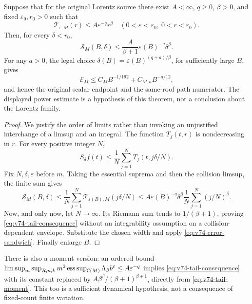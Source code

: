 \begin{theorem}
\label{thm:v74-tail-criterion}
Suppose that for the original Lorentz source there exist
$A<\infty$, $q\ge0$, $\beta>0$, and fixed $\varepsilon_0,r_0>0$
such that
\begin{equation}\label{eq:v74-tail-premise}
 \mathcal T_{\varepsilon,M}(r)
        \le A\varepsilon^{-q}r^\beta
       \quad(0<\varepsilon<\varepsilon_0,\ 0<r<r_0).
\end{equation}
Then, for every $\delta<r_0$,
\begin{equation}\label{eq:v74-tail-consequence}
 \mathcal S_M(B,\delta)
       \le\frac{A}{\beta+1}\varepsilon(B)^{-q}\delta^\beta.
\end{equation}
For any $a>0$, the legal choice
$\delta(B)=\varepsilon(B)^{(q+a)/\beta}$, for sufficiently large $B$,
gives
\[
 \mathcal E_M\le C_MB^{-1/192}+C_{M,a}B^{-a/12},
\]
and hence the original scalar endpoint and the same-roof path
numerator. The displayed power estimate is a hypothesis of this
theorem, not a conclusion about the Lorentz family.
\end{theorem}
\begin{proof}
We justify the order of limits rather than invoking an unjustified
interchange of a limsup and an integral. The function $T_f(t,r)$
is nondecreasing in $r$. For every positive integer $N$,
\[
 S_\delta f(t)\le\frac1N\sum_{j=1}^N T_f(t,j\delta/N).
\]
Fix $N,\delta,\varepsilon$ before $m$. Taking the essential suprema
and then the collision limsup, the finite sum gives
\[
 \mathcal S_M(B,\delta)
 \le\frac1N\sum_{j=1}^N\mathcal T_{\varepsilon(B),M}(j\delta/N)
 \le A\varepsilon(B)^{-q}\delta^\beta
                         \frac1N\sum_{j=1}^N(j/N)^\beta.
\]
Now, and only now, let $N\to\infty$. Its Riemann sum tends to
$1/(\beta+1)$, proving \eqref{eq:v74-tail-consequence} without
an integrability assumption on a collision-dependent envelope.
Substitute the chosen width and apply
\eqref{eq:v74-error-sandwich}. Finally enlarge $B$.
\end{proof}

There is also a moment version: an ordered bound
$\limsup_m\sup_{R,n,k}m^2\operatorname*{ess\,sup}_{\mathcal C(M)}
\Lambda_\beta b^\varepsilon\le A\varepsilon^{-q}$ implies
\eqref{eq:v74-tail-consequence} with its constant replaced by
$A\beta^\beta/(\beta+1)^{\beta+1}$, directly from
\eqref{eq:v74-tail-moment}. This too is a sufficient dynamical
hypothesis, not a consequence of fixed-count finite variation.

